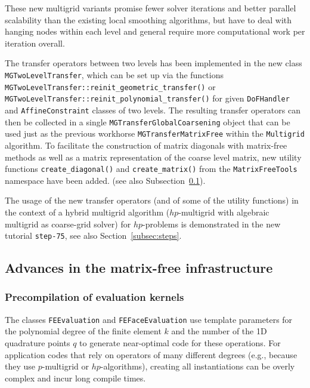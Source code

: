 \documentclass{ansarticle-preprint}
\begin{document}
These new multigrid variants promise fewer solver
iterations and better parallel scalability than the existing local
smoothing algorithms, but have to deal with
hanging nodes within each level and general require more computational
work per iteration overall.

The transfer operators between two levels has been implemented in the new class \texttt{MGTwoLevelTransfer}, which can be set up via the functions \texttt{MGTwoLevelTransfer::\allowbreak reinit\_\allowbreak geometric\_\allowbreak transfer()} or \texttt{MGTwo\allowbreak LevelTransfer::\allowbreak reinit\_\allowbreak polynomial\_\allowbreak transfer()} for given
\texttt{DoFHandler} and \texttt{AffineConstraint} classes of two levels. The resulting transfer operators
can then be collected in a single
\texttt{MGTransferGlobalCoarsening} object that can be used just as the previous workhorse \texttt{MGTransferMatrixFree} within the \texttt{Multigrid}
algorithm.
To facilitate the construction of matrix diagonals with matrix-free methods as well as a matrix representation of the coarse level matrix, new utility functions \texttt{create\_diagonal()} and \texttt{create\_matrix()} from
the \texttt{MatrixFreeTools} namespace have been added. (see also Subsection~\ref{subsec:mf}).

The usage of the new transfer operators (and of some of the utility
functions) in the context of a hybrid multigrid algorithm
($hp$-multigrid with algebraic multigrid as coarse-grid solver) for $hp$-problems is demonstrated in the new tutorial \texttt{step-75}, see also Section~\ref{subsec:steps}.



\subsection{Advances in the matrix-free infrastructure}
\label{subsec:mf}

\subsubsection{Precompilation of evaluation kernels}

The classes \texttt{FEEvaluation} and \texttt{FEFaceEvaluation} use template parameters for
the polynomial degree of the finite element $k$ and the number of the 1D quadrature points $q$
to generate near-optimal code for these operations.
For application codes that rely on operators of many different degrees (e.g., because
they use $p$-multigrid or $hp$-algorithms), creating all instantiations
can be overly complex and incur long compile times.
\end{document}
